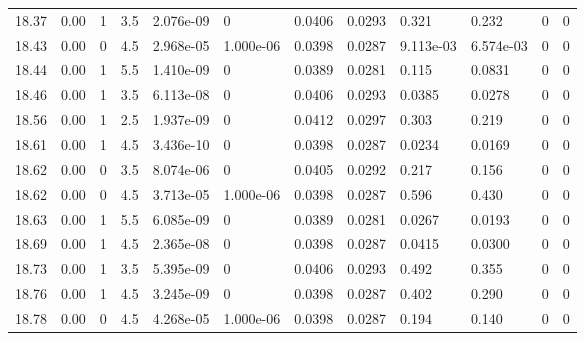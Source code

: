 \documentclass[preview]{standalone}
\begin{document}
{{{{{{{{{{{{\begin{tabular}{L{1.2cm}C{1.2cm} C{0.3cm}C{0.5cm} C{1.4cm}C{1.4cm} C{1.4cm}C{1.4cm} C{1.6cm}C{1.6cm} C{1.6cm}C{1.6cm}}
  18.37  &  0.00  & 1     & 3.5 &  2.076e-09  & 0  &  0.0406&   0.0293& 0.321 & 0.232   &  0 & 0  \\ 
  18.43  &  0.00  & 0     & 4.5 &  2.968e-05  & 1.000e-06  &  0.0398&   0.0287& 9.113e-03 & 6.574e-03   &  0 & 0  \\ 
  18.44  &  0.00  & 1     & 5.5 &  1.410e-09  & 0  &  0.0389&   0.0281& 0.115 & 0.0831   &  0 & 0  \\ 
  18.46  &  0.00  & 1     & 3.5 &  6.113e-08  & 0  &  0.0406&   0.0293& 0.0385 & 0.0278   &  0 & 0  \\ 
  18.56  &  0.00  & 1     & 2.5 &  1.937e-09  & 0  &  0.0412&   0.0297& 0.303 & 0.219   &  0 & 0  \\ 
  18.61  &  0.00  & 1     & 4.5 &  3.436e-10  & 0  &  0.0398&   0.0287& 0.0234 & 0.0169   &  0 & 0  \\ 
  18.62  &  0.00  & 0     & 3.5 &  8.074e-06  & 0  &  0.0405&   0.0292& 0.217 & 0.156   &  0 & 0  \\ 
  18.62  &  0.00  & 0     & 4.5 &  3.713e-05  & 1.000e-06  &  0.0398&   0.0287& 0.596 & 0.430   &  0 & 0  \\ 
  18.63  &  0.00  & 1     & 5.5 &  6.085e-09  & 0  &  0.0389&   0.0281& 0.0267 & 0.0193   &  0 & 0  \\ 
  18.69  &  0.00  & 1     & 4.5 &  2.365e-08  & 0  &  0.0398&   0.0287& 0.0415 & 0.0300   &  0 & 0  \\ 
  18.73  &  0.00  & 1     & 3.5 &  5.395e-09  & 0  &  0.0406&   0.0293& 0.492 & 0.355   &  0 & 0  \\ 
  18.76  &  0.00  & 1     & 4.5 &  3.245e-09  & 0  &  0.0398&   0.0287& 0.402 & 0.290   &  0 & 0  \\ 
  18.78  &  0.00  & 0     & 4.5 &  4.268e-05  & 1.000e-06  &  0.0398&   0.0287& 0.194 & 0.140   &  0 & 0  \\ 
\hline 
\end{tabular} 

}}}}}}}}}}}}
\end{document}
